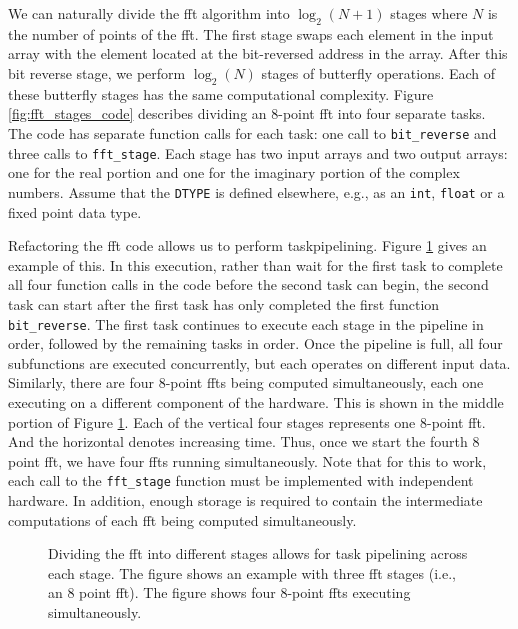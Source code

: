 We can naturally divide the \gls{fft} algorithm into $\log_2(N+1)$ stages where $N$ is the number of points of the \gls{fft}.  The first stage swaps each element in the input array with the element located at the bit-reversed address in the array. After this bit reverse stage, we perform $\log_2(N)$ stages of butterfly operations. Each of these butterfly stages has the same computational complexity.  Figure \ref{fig:fft_stages_code} describes dividing an 8-point \gls{fft} into four separate tasks. The code has separate function calls for each task: one call to \lstinline{bit_reverse} and three calls to \lstinline{fft_stage}. Each stage has two input arrays and two output arrays: one for the real portion and one for the imaginary portion of the complex numbers. Assume that the \lstinline{DTYPE} is defined elsewhere, e.g., as an \lstinline{int}, \lstinline{float} or a fixed point data type.

Refactoring the \gls{fft} code allows us to perform \gls{taskpipelining}. Figure \ref{fig:fftstages} gives an example of this. In this execution, rather than wait for the first task to complete all four function calls in the code before the second task can begin, the second task can start after the first task has only completed the first function \lstinline{bit_reverse}. The first task continues to execute each stage in the pipeline in order, followed by the remaining tasks in order.  Once the pipeline is full, all four subfunctions are executed concurrently, but each operates on different input data. Similarly, there are four 8-point \glspl{fft} being computed simultaneously, each one executing on a different component of the hardware. This is shown in the middle portion of Figure \ref{fig:fftstages}. Each of the vertical four stages represents one 8-point \gls{fft}. And the horizontal denotes increasing time. Thus, once we start the fourth 8 point \gls{fft}, we have four \glspl{fft} running simultaneously.  Note that for this to work, each call to the \lstinline{fft_stage} function must be implemented with independent hardware.  In addition, enough storage is required to contain the intermediate computations of each \gls{fft} being computed simultaneously.

\begin{figure}
\centering
{\scriptsize }

\caption{ Dividing the \gls{fft} into different stages allows for task pipelining across each stage. The figure shows an example with three \gls{fft} stages (i.e., an 8 point \gls{fft}). The figure shows four 8-point \glspl{fft} executing simultaneously. }
\label{fig:fftstages}
\end{figure}

